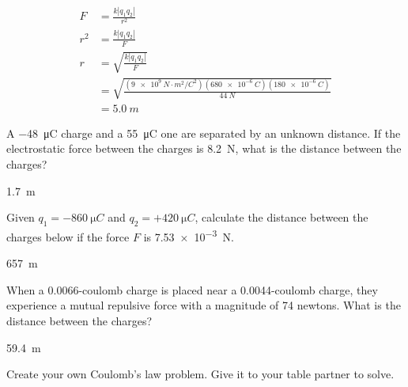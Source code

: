 \documentclass[]{exam}
\begin{document}
\begin{questions}
\begin{solution}
\begin{align*}
    F &= \frac{k \left|q_1 q_2\right|}{r^2} \\[1ex]
    r^2 &= \frac{k \left|q_1 q_2\right|}{F} \\[1ex]
    r &= \sqrt{\frac{k \left|q_1 q_2\right|}{F}} \\[1ex]
      &= \sqrt{\frac{\left(\SI{9e9}{N\cdot m^2/C^2}\right)(\SI{680e-6}{C})(\SI{180e-6}{C})}{\SI{44}{N}}} \\[1ex]
      &= \boxed{\SI{5.0}{m}}
\end{align*}
\end{solution}


\question \label{clmO0M}
A \SI{-48}{\micro C} charge and a \SI{55}{\micro C} one are separated by an unknown distance. If the electrostatic force between the charges is \SI{8.2}{N}, what is the distance between the charges?

\begin{solution}
\SI{1.7}{m}
\end{solution}

\question \label{TrRzFe}
Given $q_1 = \SI{-860}{\micro C}$ and $q_2 = +\SI{420}{\micro C}$, calculate the distance between the charges below if the force $F$ is \SI{7.53e-3}{N}.

\begin{center}
\end{center}


\begin{solution}
\SI{657}{m}
\end{solution}


\question \label{bpbHHg}
When a 0.0066-coulomb charge is placed near a 0.0044-coulomb charge, they experience a mutual repulsive force with a magnitude of 74 newtons. What is the distance between the charges?

\begin{solution}
\SI{59.4}{m}
\end{solution}



\question \label{DOuqpT}
Create your own Coulomb's law problem. Give it to your table partner to solve.

\end{questions}
\end{document}
